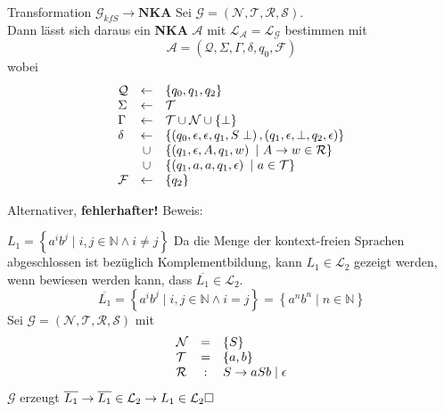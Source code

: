 \documentclass[]{beamer}
\begin{document}
\begin{frame}[squeeze]{}
  \begin{block}{Transformation $\mathcal{G}_{kfS} \rightarrow \textbf{NKA}$}
    Sei $\mathcal{G} = \left( \mathcal{N}, \mathcal{T}, \mathcal{R}, \mathcal{S} \right)$. \\
    Dann lässt sich daraus ein \textbf{NKA} $\mathcal{A}$ mit $\mathcal{L_A} = \mathcal{L_G}$ bestimmen mit
    \[\mathcal{A} = \left( \mathcal{Q}, \Sigma, \Gamma, \delta, q_0, \mathcal{F} \right)\]
    wobei
    \[\begin{array}{l c l}
        \mathcal{Q} & \leftarrow & \left\{ q_0, q_1, q_2 \right\} \\
        \Sigma      & \leftarrow & \mathcal{T} \\
        \Gamma      & \leftarrow & \mathcal{T} \cup \mathcal{N} \cup \left\{ \perp \right\} \\
        \delta      & \leftarrow & \left\{ \left( q_0, \epsilon, \epsilon, q_1, S\perp \right), \left( q_1, \epsilon, \perp, q_2, \epsilon \right) \right\} \\
                    & \cup       & \left\{ \left( q_1, \epsilon, A, q_1, w \right) \ | \ A \rightarrow w \in \mathcal{R} \right\} \\
                    & \cup       & \left\{ \left( q_1, a, a, q_1, \epsilon \right) \ | \ a \in \mathcal{T} \right\} \\
        \mathcal{F} & \leftarrow & \{q_2\} \\
      \end{array}\]
  \end{block}
\end{frame}

\begin{frame}[squeeze]{}
  Alternativer, \textbf{fehlerhafter!} Beweis:
  \begin{exampleblock}{$L_1 = \left\{ a^i b^j \;|\; i, j \in \mathbb{N} \wedge i \neq j \right\}$}
  Da die Menge der kontext-freien Sprachen abgeschlossen ist bezüglich Komplementbildung, kann $L_1 \in \mathcal{L}_2$ gezeigt werden, wenn bewiesen werden kann, dass $\overline{L_1} \in \mathcal{L}_2$.
  \pause
  \[\overline{L_1} = \left\{ a^i b^j \;|\; i, j \in \mathbb{N} \wedge i = j \right\} = \left\{ a^n b^n \;|\; n \in \mathbb{N} \right\}\]
  \pause
  Sei $\mathcal{G} = (\mathcal{N}, \mathcal{T}, \mathcal{R}, \mathcal{S})$ mit
  \[\begin{array}{l c l}
      \mathcal{N} & = & \{S\} \\
      \mathcal{T} & = & \{a, b\} \\
      \mathcal{R} & : & S \rightarrow aSb \;|\; \epsilon \\
    \end{array}\]
  \pause
  $\mathcal{G}$ erzeugt $\overline{L_1} \rightarrow \overline{L_1} \in \mathcal{L}_2 \rightarrow L_1 \in \mathcal{L}_2 \hfill \square$
  \end{exampleblock}
\end{frame}
\end{document}
